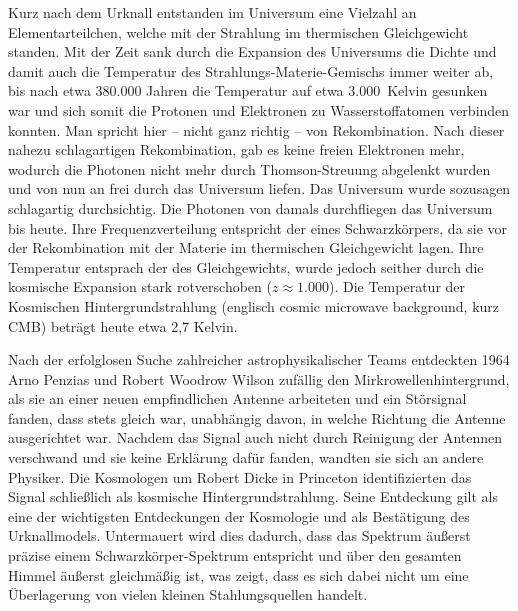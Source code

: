 \documentclass[10pt,a4paper]{article}
\begin{document}
Kurz nach dem Urknall entstanden im Universum eine Vielzahl an Elementarteilchen, welche mit der Strahlung im thermischen Gleichgewicht standen. Mit der Zeit sank durch die Expansion des Universums die Dichte und damit auch die Temperatur des Strahlungs-Materie-Gemischs immer weiter ab, bis nach etwa 380.000 Jahren die Temperatur auf etwa 3.000\ Kelvin gesunken war und sich somit die Protonen und Elektronen zu Wasserstoffatomen verbinden konnten.
Man spricht hier -- nicht ganz richtig -- von Rekombination. Nach dieser nahezu schlagartigen Rekombination, gab es keine freien Elektronen mehr, wodurch die Photonen nicht mehr durch Thomson-Streuung abgelenkt wurden und von nun an frei durch das Universum liefen. Das Universum wurde sozusagen schlagartig durchsichtig. Die Photonen von damals durchfliegen das Universum bis heute. Ihre Frequenzverteilung entspricht der eines Schwarzkörpers, da sie vor der Rekombination mit der Materie im thermischen Gleichgewicht lagen. Ihre Temperatur entsprach der des Gleichgewichts, wurde jedoch seither durch die kosmische Expansion stark rotverschoben ($z\approx 1.000$). Die Temperatur der Kosmischen Hintergrundstrahlung (englisch cosmic microwave background, kurz CMB) beträgt heute etwa 2,7 Kelvin.

Nach der erfolglosen Suche zahlreicher astrophysikalischer Teams entdeckten 1964 Arno Penzias und Robert Woodrow Wilson zufällig den Mirkrowellenhintergrund, als sie an einer neuen empfindlichen Antenne arbeiteten und ein Störsignal fanden, dass stets gleich war, unabhängig davon, in welche Richtung die Antenne ausgerichtet war. Nachdem das Signal auch nicht durch Reinigung der Antennen verschwand und sie keine Erklärung dafür fanden, wandten sie sich an andere Physiker. Die Kosmologen um Robert Dicke in Princeton identifizierten das Signal schließlich als kosmische Hintergrundstrahlung. Seine Entdeckung gilt als eine der wichtigsten Entdeckungen der Kosmologie und als Bestätigung des Urknallmodels. Untermauert wird dies dadurch, dass das Spektrum äußerst präzise einem Schwarzkörper-Spektrum entspricht und über den gesamten Himmel äußerst gleichmäßig ist, was zeigt, dass es sich dabei nicht um eine Überlagerung von vielen kleinen Stahlungsquellen handelt.
\end{document}
